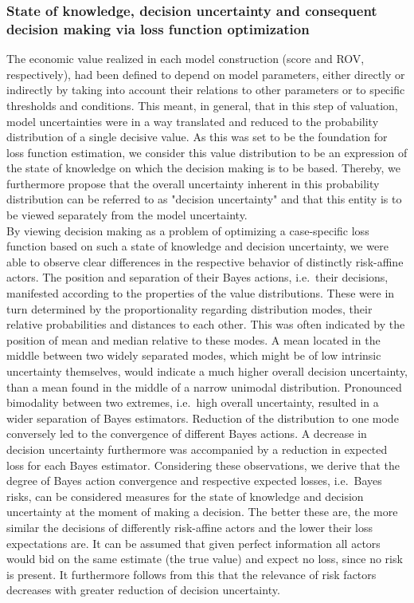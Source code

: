 	\subsubsection{State of knowledge, decision uncertainty and consequent decision making via loss function optimization}
	The economic value realized in each model construction (score and ROV, respectively), had been defined to depend on model parameters, either directly or indirectly by taking into account their relations to other parameters or to specific thresholds and conditions. This meant, in general, that in this step of valuation, model uncertainties were in a way translated and reduced to the probability distribution of a single decisive value. As this was set to be the foundation for loss function estimation, we consider this value distribution to be an expression of the state of knowledge on which the decision making is to be based. Thereby, we furthermore propose that the overall uncertainty inherent in this probability distribution can be referred to as "decision uncertainty" and that this entity is to be viewed separately from the model uncertainty.\\	
	By viewing decision making as a problem of optimizing a case-specific loss function based on such a state of knowledge and decision uncertainty, we were able to observe clear differences in the respective behavior of distinctly risk-affine actors.
	The position and separation of their Bayes actions, i.e.\ their decisions, manifested according to the properties of the value distributions. These were in turn determined by the proportionality regarding distribution modes, their relative probabilities and distances to each other. This was often indicated by the position of mean and median relative to these modes. A mean located in the middle between two widely separated modes, which might be of low intrinsic uncertainty themselves, would indicate a much higher overall decision uncertainty, than a mean found in the middle of a narrow unimodal distribution. Pronounced bimodality between two extremes, i.e.\ high overall uncertainty, resulted in a wider separation of Bayes estimators. Reduction of the distribution to one mode conversely led to the convergence of different Bayes actions. A decrease in decision uncertainty furthermore was accompanied by a reduction in expected loss for each Bayes estimator. 
	Considering these observations, we derive that the degree of Bayes action convergence and respective expected losses, i.e.\ Bayes risks, can be considered measures for the state of knowledge and decision uncertainty at the moment of making a decision. The better these are, the more similar the decisions of differently risk-affine actors and the lower their loss expectations are. It can be assumed that given perfect information all actors would bid on the same estimate (the true value) and expect no loss, since no risk is present. It furthermore follows from this that the relevance of risk factors decreases with greater reduction of decision uncertainty.
